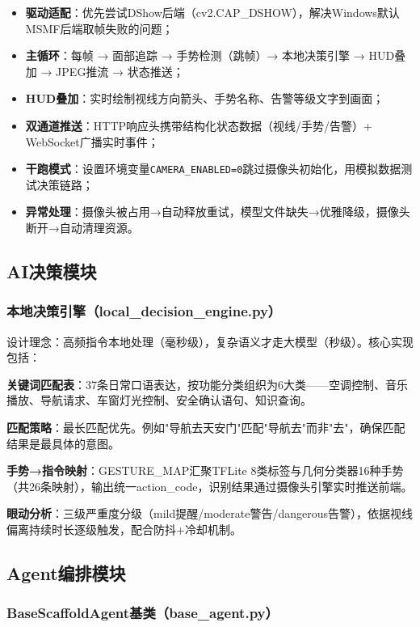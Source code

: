 \documentclass[a4paper]{article}
\begin{document}
\begin{itemize}
    \item \textbf{驱动适配}：优先尝试DShow后端（cv2.CAP\_DSHOW），解决Windows默认MSMF后端取帧失败的问题；
    \item \textbf{主循环}：每帧 → 面部追踪 → 手势检测（跳帧）→ 本地决策引擎 → HUD叠加 → JPEG推流 → 状态推送；
    \item \textbf{HUD叠加}：实时绘制视线方向箭头、手势名称、告警等级文字到画面；
    \item \textbf{双通道推送}：HTTP响应头携带结构化状态数据（视线/手势/告警）+ WebSocket广播实时事件；
    \item \textbf{干跑模式}：设置环境变量\texttt{CAMERA\_ENABLED=0}跳过摄像头初始化，用模拟数据测试决策链路；
    \item \textbf{异常处理}：摄像头被占用→自动释放重试，模型文件缺失→优雅降级，摄像头断开→自动清理资源。
\end{itemize}

\subsection{AI决策模块}

\subsubsection{本地决策引擎（local\_decision\_engine.py）}

设计理念：高频指令本地处理（毫秒级），复杂语义才走大模型（秒级）。核心实现包括：

\textbf{关键词匹配表}：37条日常口语表达，按功能分类组织为6大类——空调控制、音乐播放、导航请求、车窗灯光控制、安全确认语句、知识查询。

\textbf{匹配策略}：最长匹配优先。例如"导航去天安门"匹配"导航去"而非"去"，确保匹配结果是最具体的意图。

\textbf{手势→指令映射}：GESTURE\_MAP汇聚TFLite 8类标签与几何分类器16种手势（共26条映射），输出统一action\_code，识别结果通过摄像头引擎实时推送前端。

\textbf{眼动分析}：三级严重度分级（mild提醒/moderate警告/dangerous告警），依据视线偏离持续时长逐级触发，配合防抖+冷却机制。

\subsection{Agent编排模块}

\subsubsection{BaseScaffoldAgent基类（base\_agent.py）}
\end{document}
